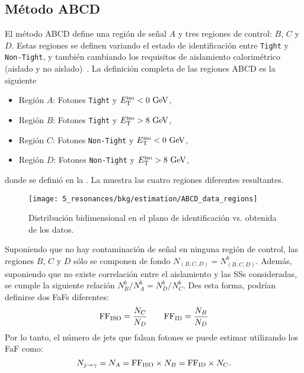 \subsection{Método ABCD}
\label{subsec:bkg:estimation:abcd}

El método ABCD define una región de señal \(A\) y tres regiones de control: \(B\), \(C\) y \(D\).
Estas regiones se definen variando el estado de identificación entre \texttt{Tight} y \texttt{Non-Tight}, y también cambiando los requisitos de aislamiento calorimétrico (aislado y no aislado)~\cite{ATLAS-EXOTICS-Monophoton-2017}.
La definición completa de las regiones ABCD es la siguiente
\begin{itemize}
    \item Región \(A\): Fotones \texttt{Tight} y \(E_{\text{T}}^{\text{iso}} < 0~ \text{GeV}\),
    \item Región \(B\): Fotones \texttt{Tight} y \(E_{\text{T}}^{\text{iso}} > 8~ \text{GeV}\),
    \item Región \(C\): Fotones \texttt{Non-Tight} y \(E_{\text{T}}^{\text{iso}} < 0~ \text{GeV}\),
    \item Región \(D\): Fotones \texttt{Non-Tight} y \(E_{\text{T}}^{\text{iso}} > 8~ \text{GeV}\),
\end{itemize}
donde \etiso se definió en la \Eqn{\ref{eq:objects:egamma:iso:definitions}}. La \Fig{\ref{fig:bkg:estimation:abcd:diagram}} muestra las cuatro regiones diferentes resultantes.

\begin{figure}[ht!]
    \centering
    \texttt{[image: 5\_resonances/bkg/estimation/ABCD\_data\_regions]}
    \caption{Distribución bidimensional en el plano de identificación vs. \etiso obtenida de los datos.}
    \label{fig:bkg:estimation:abcd:diagram}
\end{figure}

Suponiendo que no hay contaminación de señal en ninguna región de control, las regiones \(B\), \(C\) y \(D\) sólo se componen de fondo \(N_{(B,C,D)}=N^{b}_{(B,C,D)}\). Además, suponiendo que no existe correlación entre el aislamiento y las \acp{SS} consideradas, se cumple la siguiente relación \(N^{b}_{B}/N^{b}_{A}=N^{b}_{D}/N^{b}_{C}\). Des esta forma, podrían definirse dos \acp{FaF} diferentes:
\begin{equation*}
    \text{FF}_{\text{ISO}} = \frac{N_{C}}{N_{D}} \qquad \text{FF}_{\text{ID}} = \frac{N_{B}}{N_{D}}
\end{equation*}
Por lo tanto, el número de jets que falsan fotones se puede estimar utilizando los \ac{FaF} como:
\begin{equation}
    \label{eq:bkg:estimation:abcd:njfakes}
    N_{j\rightarrow\gamma} = N_{A} = \text{FF}_{\text{ISO}} \times N_{B}  = \text{FF}_{\text{ID}} \times N_{C}.
\end{equation}

